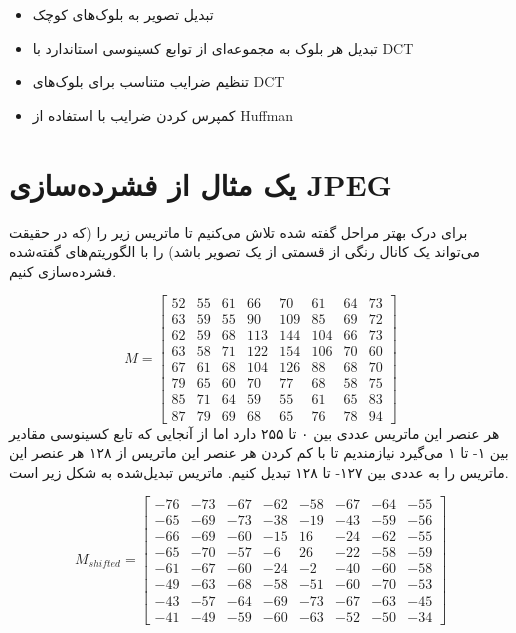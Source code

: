\begin{itemize}
        \item تبدیل تصویر به بلوک‌های کوچک 
        \item تبدیل هر بلوک به مجموعه‌ای از توابع کسینوسی استاندارد با DCT
        \item تنظیم ضرایب متناسب برای بلوک‌های DCT 
        \item کمپرس کردن ضرایب با استفاده از Huffman
\end{itemize}

\section{یک مثال از فشرده‌سازی JPEG}
برای درک بهتر مراحل گفته شده تلاش می‌کنیم تا ماتریس زیر را (که در حقیقت می‌تواند 
یک کانال رنگی از قسمتی از یک تصویر باشد) را با الگوریتم‌های گفته‌شده فشرده‌سازی کنیم.

\[
        M = \begin{bmatrix}
                52 & 55 & 61 & 66 & 70 & 61 & 64 & 73\\
                63 & 59 & 55 & 90 & 109 & 85 & 69 & 72 \\
                62 & 59 & 68 & 113 & 144 & 104 & 66 & 73 \\
                63 & 58 & 71 & 122 & 154 & 106 & 70 & 60 \\
                67 & 61 & 68 & 104 & 126 & 88 & 68 & 70 \\
                79 & 65 & 60 & 70 & 77 & 68 & 58 & 75 \\
                85 & 71 & 64 & 59 & 55 & 61 & 65 & 83 \\
                87 & 79 & 69 & 68 & 65 & 76 & 78 & 94 

        \end{bmatrix}
\]
هر عنصر این ماتریس عددی بین ۰ تا ۲۵۵ دارد اما از آنجایی که تابع کسینوسی 
مقادیر بین ۱- تا ۱ می‌گیرد نیازمندیم تا با کم کردن هر عنصر این ماتریس از 
۱۲۸ 
هر عنصر این ماتریس را به عددی بین ۱۲۷- تا ۱۲۸ تبدیل کنیم.
ماتریس تبدیل‌شده به شکل زیر است.

\[
        M_{shifted} = \begin{bmatrix}
                -76 & -73 & -67 & -62 & -58 & -67 & -64 & -55\\
                -65 & -69 & -73 & -38 & -19 & -43 & -59 & -56 \\
                -66 & -69 & -60 & -15 & 16 & -24 & -62 & -55 \\
                -65 & -70 & -57 & -6 & 26 & -22 & -58 & -59 \\
                -61 & -67 & -60 & -24 & -2 & -40 & -60 & -58 \\
                -49 & -63 & -68 & -58 & -51 & -60 & -70 & -53 \\
                -43 & -57 & -64 & -69 & -73 & -67 & -63 & -45 \\
                -41 & -49 & -59 & -60 & -63 & -52 & -50 & -34 

        \end{bmatrix}
\]


